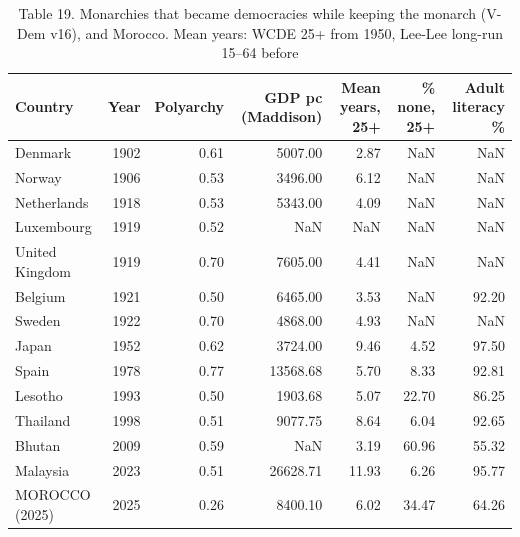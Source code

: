 \begin{table}
\caption{Table 19. Monarchies that became democracies while keeping the monarch (V-Dem v16), and Morocco. Mean years: WCDE 25+ from 1950, Lee-Lee long-run 15–64 before}
\label{tab:T19_royal_democratisations}
\begin{tabular}{lrrrrrr}
\toprule
Country & Year & Polyarchy & GDP pc (Maddison) & Mean years, 25+ & \% none, 25+ & Adult literacy \% \\
\midrule
Denmark & 1902 & 0.61 & 5007.00 & 2.87 & NaN & NaN \\
Norway & 1906 & 0.53 & 3496.00 & 6.12 & NaN & NaN \\
Netherlands & 1918 & 0.53 & 5343.00 & 4.09 & NaN & NaN \\
Luxembourg & 1919 & 0.52 & NaN & NaN & NaN & NaN \\
United Kingdom & 1919 & 0.70 & 7605.00 & 4.41 & NaN & NaN \\
Belgium & 1921 & 0.50 & 6465.00 & 3.53 & NaN & 92.20 \\
Sweden & 1922 & 0.70 & 4868.00 & 4.93 & NaN & NaN \\
Japan & 1952 & 0.62 & 3724.00 & 9.46 & 4.52 & 97.50 \\
Spain & 1978 & 0.77 & 13568.68 & 5.70 & 8.33 & 92.81 \\
Lesotho & 1993 & 0.50 & 1903.68 & 5.07 & 22.70 & 86.25 \\
Thailand & 1998 & 0.51 & 9077.75 & 8.64 & 6.04 & 92.65 \\
Bhutan & 2009 & 0.59 & NaN & 3.19 & 60.96 & 55.32 \\
Malaysia & 2023 & 0.51 & 26628.71 & 11.93 & 6.26 & 95.77 \\
MOROCCO (2025) & 2025 & 0.26 & 8400.10 & 6.02 & 34.47 & 64.26 \\
\bottomrule
\end{tabular}
\end{table}
